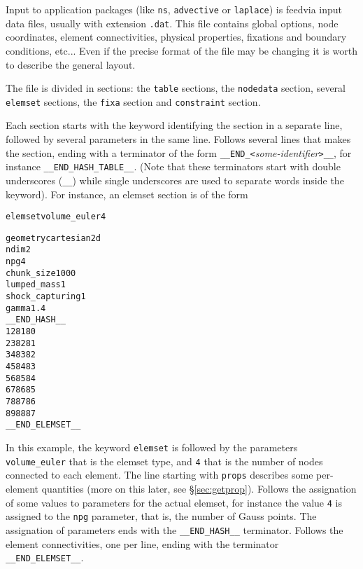 
%
Input to application packages (like \verb+ns+, \verb+advective+ or
\verb+laplace+) is feedvia input data files, usually with extension
\verb+.dat+. This file contains global options, node coordinates,
element connectivities, physical properties, fixations and boundary
conditions, etc... Even if the precise format of the file may be
changing it is worth to describe the general layout. 

The file is divided in sections: the 
\verb+table+ sections, the \verb+nodedata+ section, several
\verb+elemset+ sections, the \verb+fixa+ section and \verb+constraint+
section. 

Each section starts with the keyword identifying the section in a
separate line, followed by several parameters in the same
line. Follows several lines that makes the section, ending with a
terminator of the form \verb+__END_<+\emph{some-identifier}\verb+>__+,
for instance \verb+__END_HASH_TABLE__+. (Note that these terminators
start with double underscores (\verb+__+) while single underscores are
used to separate words inside the keyword).  For instance, an elemset
section is of the form

\begin{alltt}
elemset volume_euler 4

geometry cartesian2d
ndim 2
npg 4
chunk_size 1000
lumped_mass 1
shock_capturing 1
gamma 1.4
__END_HASH__
    1    2   81   80
    2    3   82   81
    3    4   83   82
    4    5   84   83
    5    6   85   84
    6    7   86   85
    7    8   87   86
    8    9   88   87
__END_ELEMSET__
\end{alltt}

In this example, the keyword \verb+elemset+ is followed by the
parameters \verb+volume_euler+ that is the elemset type, and
\verb+4+ that is the number of nodes connected to each element. The
line starting with \verb+props+ 
describes some per-element quantities (more on this later, see
\S\ref{sec:getprop}). Follows the assignation of some values to
parameters for the actual elemset, for instance the value \verb+4+ is
assigned to the \verb+npg+ parameter, that is, the number of Gauss
points. The assignation of parameters ends with the \verb+__END_HASH__+
terminator. Follows the element connectivities, one per line, ending
with the terminator \verb+__END_ELEMSET__+. 

